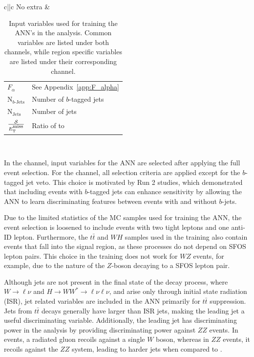 \begin{table}
\begin{tabular}{c||c}
  \hline
  No extra &
  \begin{tabular}{l@{: }l}
    $F_{\alpha}$ & See Appendix~\ref{app:F_alpha} \\
    $\mathrm{N}_{b\text{-Jets}}$ & Number of $b$-tagged jets \\
    $\mathrm{N}_{\text{Jets}}$ & Number of jets \\
    $\frac{\mathcal{S}}{E_{\mathrm{T}}^{\textsuperscript{miss}}}$ & Ratio of \metsig{} to \met{} \\
  \end{tabular} \\
  \hline
  \end{tabular}
  \caption{Input variables used for training the ANN's in the \wh{} analysis. Common variables are listed under both channels, while region specific variables are listed under their corresponding channel.}\label{tab:vh_wh_input_variables}
\end{table}

In the \zdom{} channel, input variables for the ANN are selected after applying the full event selection. For the \zdep{} channel, all selection criteria are applied except for the $b$-tagged jet veto. This choice is motivated by Run 2 studies, which demonstrated that including events with $b$-tagged jets can enhance sensitivity by allowing the ANN to learn discriminating features between events with and without $b$-jets.

Due to the limited statistics of the MC samples used for training the \zdep{} ANN, the event selection is loosened to include events with two tight leptons and one anti-ID lepton. Furthermore, the $t\bar{t}$ and $WH$ samples used in the \zdep{} training also contain events that fall into the \zdom{} signal region, as these processes do not depend on SFOS lepton pairs. This choice in the training does not work for $WZ$ events, for example, due to the nature of the $Z$-boson decaying to a SFOS lepton pair.

Although jets are not present in the final state of the \wh{} decay process, where $W \to \ell\nu$ and $H \to WW^{*}\to \ell\nu\ell\nu$, and arise only through initial state radiation (ISR), jet related variables are included in the ANN primarily for $t\bar{t}$ suppression. Jets from $t\bar{t}$ decays generally have larger \pt{} than ISR jets, making the leading jet \pt{} a useful discriminating variable. Additionally, the leading jet \pt{} has discriminating power in the \zdom{} analysis by providing discriminating power against $ZZ$ events. In \wh{} events, a radiated gluon recoils against a single $W$ boson, whereas in $ZZ$ events, it recoils against the $ZZ$ system, leading to harder jets when compared to \wh{}.

